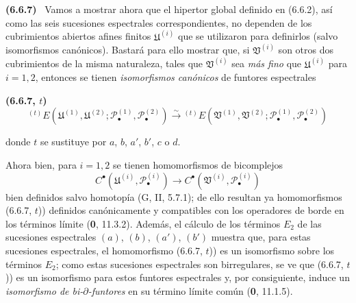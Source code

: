 \documentclass[10pt,oneside]{book}
\newenvironment{env}[1][]{\par\medskip\noindent\textbf{(#1)}\ }{\par}
\begin{document}
\begin{env}[6.6.7]
\label{III.6.6.7}
Vamos a mostrar ahora que el hipertor global definido en (6.6.2), así como
las seis sucesiones espectrales correspondientes, no dependen de los
cubrimientos abiertos afines finitos $\mathfrak U^{(i)}$ que se utilizaron
para definirlos (salvo isomorfismos canónicos). Bastará para ello mostrar que,
si $\mathfrak V^{(i)}$ son otros dos cubrimientos de la misma naturaleza,
tales que $\mathfrak V^{(i)}$ sea \emph{más fino} que $\mathfrak U^{(i)}$
para $i=1,2$, entonces se tienen \emph{isomorfismos canónicos} de funtores
espectrales
\begin{env}[6.6.7, $t$]
\label{III.6.6.7.t}
\[
  {}^{(t)}E
  (\mathfrak U^{(1)},\mathfrak U^{(2)};
   \mathscr P_\bullet^{(1)},\mathscr P_\bullet^{(2)})
  \xrightarrow{\sim}
  {}^{(t)}E
  (\mathfrak V^{(1)},\mathfrak V^{(2)};
   \mathscr P_\bullet^{(1)},\mathscr P_\bullet^{(2)})
  \tag{6.6.7, $t$)}\label{III.6.6.7.t.eq}
\]
\end{env}
donde $t$ se sustituye por $a$, $b$, $a'$, $b'$, $c$ o $d$.

Ahora bien, para $i=1,2$ se tienen homomorfismos de bicomplejos
\[
  C^\bullet(\mathfrak U^{(i)},\mathscr P_\bullet^{(i)})
  \longrightarrow
  C^\bullet(\mathfrak V^{(i)},\mathscr P_\bullet^{(i)})
\]
bien definidos salvo homotopía (G, II, 5.7.1); de ello resultan ya
homomorfismos (6.6.7, $t$)) definidos canónicamente y compatibles con los
operadores de borde en los términos límite (\textbf{0}, 11.3.2). Además,
el cálculo de los términos $E_2$ de las sucesiones espectrales $(a)$, $(b)$,
$(a')$, $(b')$ muestra que, para estas sucesiones espectrales, el homomorfismo
(6.6.7, $t$)) es un isomorfismo sobre los términos $E_2$; como estas sucesiones
espectrales son birregulares, se ve que (6.6.7, $t$)) es un isomorfismo para
estos funtores espectrales y, por consiguiente, induce un \emph{isomorfismo de
bi-$\partial$-funtores} en su término límite común
(\textbf{0}, 11.1.5).


\end{env}
\end{document}
